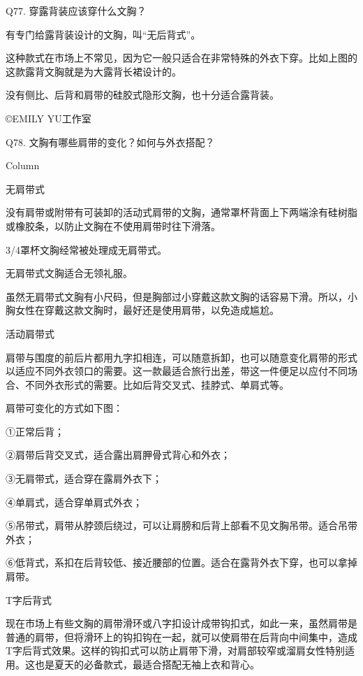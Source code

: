 \documentclass[12pt,UTF8]{ctexbook}
\begin{document}
Q77. 穿露背装应该穿什么文胸？


有专门给露背装设计的文胸，叫“无后背式”。



这种款式在市场上不常见，因为它一般只适合在非常特殊的外衣下穿。比如上图的这款露背文胸就是为大露背长裙设计的。

没有侧比、后背和肩带的硅胶式隐形文胸，也十分适合露背装。

©EMILY YU工作室





Q78. 文胸有哪些肩带的变化？如何与外衣搭配？



Column

无肩带式

没有肩带或附带有可装卸的活动式肩带的文胸，通常罩杯背面上下两端涂有硅树脂或橡胶条，以防止文胸在不使用肩带时往下滑落。

3/4罩杯文胸经常被处理成无肩带式。

无肩带式文胸适合无领礼服。

虽然无肩带式文胸有小尺码，但是胸部过小穿戴这款文胸的话容易下滑。所以，小胸女性在穿戴这款文胸时，最好还是使用肩带，以免造成尴尬。

活动肩带式

肩带与围度的前后片都用九字扣相连，可以随意拆卸，也可以随意变化肩带的形式以适应不同外衣领口的需要。这一款最适合旅行出差，带这一件便足以应付不同场合、不同外衣形式的需要。比如后背交叉式、挂脖式、单肩式等。

肩带可变化的方式如下图：

①正常后背；

②肩带后背交叉式，适合露出肩胛骨式背心和外衣；

③无肩带式，适合穿在露肩外衣下；

④单肩式，适合穿单肩式外衣；

⑤吊带式，肩带从脖颈后绕过，可以让肩膀和后背上部看不见文胸吊带。适合吊带外衣；

⑥低背式，系扣在后背较低、接近腰部的位置。适合在露背外衣下穿，也可以拿掉肩带。



T字后背式

现在市场上有些文胸的肩带滑环或八字扣设计成带钩扣式，如此一来，虽然肩带是普通的肩带，但将滑环上的钩扣钩在一起，就可以使肩带在后背向中间集中，造成T字后背式效果。这样的钩扣式可以防止肩带下滑，对肩部较窄或溜肩女性特别适用。这也是夏天的必备款式，最适合搭配无袖上衣和背心。
\end{document}
